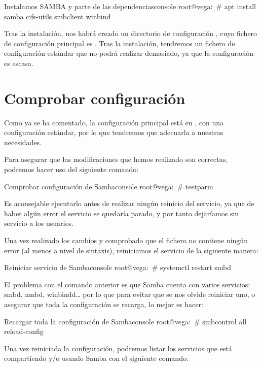 \documentclass{../../../yukibook.cls/yukibook}
\begin{document}
\begin{mycode}{Instalamos SAMBA y parte de las dependencias}{console}{}
root@vega:~# apt install samba cifs-utils smbclient winbind
\end{mycode}

Tras la instalación, nos habrá creado un directorio de configuración   , cuyo fichero de configuración principal es  . Tras la instalación, tendremos un fichero de configuración estándar que no podrá realizar demasiado, ya que la configuración es escasa.

\section{Comprobar configuración}
Como ya se ha comentado, la configuración principal está en    , con una configuración estándar, por lo que tendremos que adecuarla a nuestras necesidades.

Para asegurar que las modificaciones que hemos realizado son correctas, podremos hacer uso del siguiente comando:

\begin{mycode}{Comprobar configuración de Samba}{console}{}
root@vega:~# testparm
\end{mycode}

Es aconsejable ejecutarlo antes de realizar ningún reinicio del servicio, ya que de haber algún error el servicio se quedaría parado, y por tanto dejaríamos sin servicio a los usuarios.

Una vez realizado los cambios y comprobado que el fichero no contiene ningún error (al menos a nivel de sintaxis), reiniciamos el servicio de la siguiente manera:

\begin{mycode}{Reiniciar servicio de Samba}{console}{}
root@vega:~# systemctl restart smbd
\end{mycode}

El problema con el comando anterior es que Samba cuenta con varios servicios: smbd, nmbd, winbindd… por lo que para evitar que se nos olvide reiniciar uno, o asegurar que toda la configuración se recarga, lo mejor es hacer:

\begin{mycode}{Recargar toda la configuración de Samba}{console}{}
root@vega:~# smbcontrol all reload-config
\end{mycode}

Una vez reiniciada la configuración, podremos listar los servicios que está compartiendo y/o usando Samba con el siguiente comando:
\end{document}
